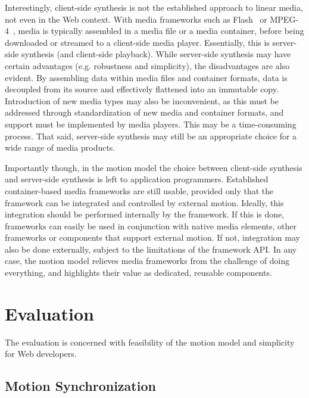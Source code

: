 \documentclass[graybox]{svmult}
\begin{document}
Interestingly, client-side synthesis is not the established approach to linear
media, not even in the Web context. With media frameworks such as Flash~\cite{flash} or
MPEG-4~\cite{mpeg4}, media is typically assembled in a media file or a media container, before
being downloaded or streamed to a client-side media player. Essentially, this is
server-side synthesis (and client-side playback). While server-side synthesis
may have certain advantages (e.g. robustness and simplicity), the
disadvantages are also evident. By assembling data within media files and container
formats, data is decoupled from its source and effectively flattened into an
immutable copy. Introduction of new media types may also be inconvenient, as this must be addressed through
standardization of new media and container formats, and support must be
implemented by media players. This may be a time-consuming process. That
said, server-side synthesis may still be an appropriate choice for a wide
range of media products.

Importantly though, in the motion model the choice between client-side 
synthesis and server-side synthesis is left to application programmers.
Established container-based media frameworks are still usable, provided only
that the framework can be integrated and controlled by external motion.
Ideally, this integration should be performed internally by the framework. If
this is done, frameworks can easily be used in conjunction with native media
elements, other frameworks or components that support external motion. If not,
integration may also be done externally, subject to the limitations of the
framework API. In any case, the motion model relieves media
frameworks from the challenge of doing everything, and highlights their value
as dedicated, reusable components.


\section{Evaluation}
\label{sec:eval}
The evaluation is concerned with feasibility of the motion model and
simplicity for Web developers.


\subsection {Motion Synchronization}
\end{document}
